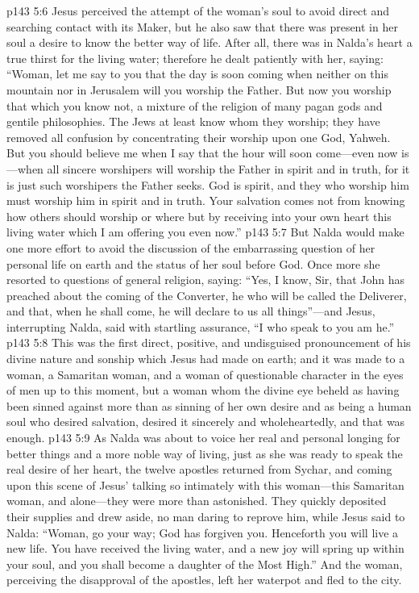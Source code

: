 \vs p143 5:6 Jesus perceived the attempt of the woman’s soul to avoid direct and searching contact with its Maker, but he also saw that there was present in her soul a desire to know the better way of life. After all, there was in Nalda’s heart a true thirst for the living water; therefore he dealt patiently with her, saying: \textcolor{ubdarkred}{“Woman, let me say to you that the day is soon coming when neither on this mountain nor in Jerusalem will you worship the Father. But now you worship that which you know not, a mixture of the religion of many pagan gods and gentile philosophies. The Jews at least know whom they worship; they have removed all confusion by concentrating their worship upon one God, Yahweh. But you should believe me when I say that the hour will soon come---even now is---when all sincere worshipers will worship the Father in spirit and in truth, for it is just such worshipers the Father seeks. God is spirit, and they who worship him must worship him in spirit and in truth. Your salvation comes not from knowing how others should worship or where but by receiving into your own heart this living water which I am offering you even now.”}
\vs p143 5:7 But Nalda would make one more effort to avoid the discussion of the embarrassing question of her personal life on earth and the status of her soul before God. Once more she resorted to questions of general religion, saying: “Yes, I know, Sir, that John has preached about the coming of the Converter, he who will be called the Deliverer, and that, when he shall come, he will declare to us all things”---and Jesus, interrupting Nalda, said with startling assurance, \textcolor{ubdarkred}{“I who speak to you am he.”}
\vs p143 5:8 This was the first direct, positive, and undisguised pronouncement of his divine nature and sonship which Jesus had made on earth; and it was made to a woman, a Samaritan woman, and a woman of questionable character in the eyes of men up to this moment, but a woman whom the divine eye beheld as having been sinned against more than as sinning of her own desire and as  being a human soul who desired salvation, desired it sincerely and wholeheartedly, and that was enough.
\vs p143 5:9 As Nalda was about to voice her real and personal longing for better things and a more noble way of living, just as she was ready to speak the real desire of her heart, the twelve apostles returned from Sychar, and coming upon this scene of Jesus’ talking so intimately with this woman---this Samaritan woman, and alone---they were more than astonished. They quickly deposited their supplies and drew aside, no man daring to reprove him, while Jesus said to Nalda: \textcolor{ubdarkred}{“Woman, go your way; God has forgiven you. Henceforth you will live a new life. You have received the living water, and a new joy will spring up within your soul, and you shall become a daughter of the Most High.”} And the woman, perceiving the disapproval of the apostles, left her waterpot and fled to the city.
